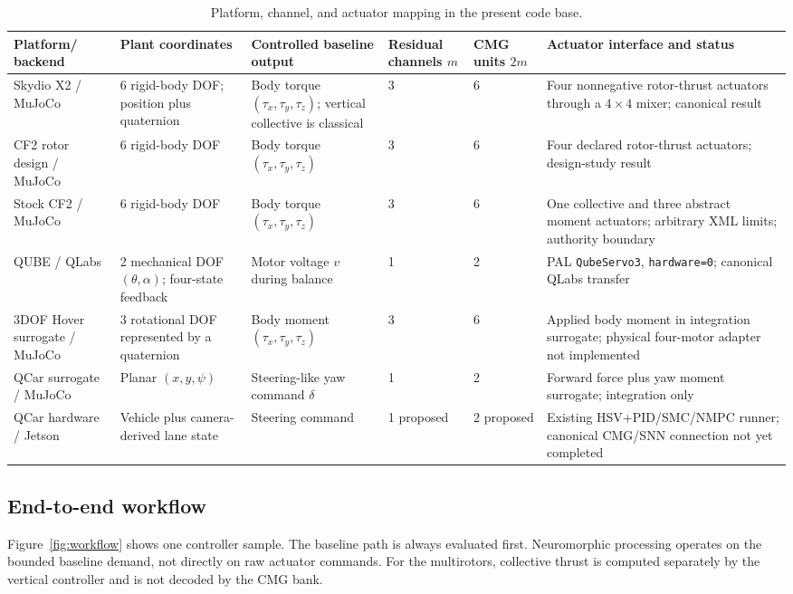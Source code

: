 \documentclass[10pt,twocolumn]{article}
\begin{document}
\begin{table}[t]
\centering
\caption{Platform, channel, and actuator mapping in the present code base.}
\label{tab:channels}
\small
\begin{tabular}{p{2.2cm}p{2.1cm}p{2.6cm}p{1.6cm}p{1.7cm}p{3.4cm}}
\toprule
\shortstack[l]{Platform/\\backend} & Plant coordinates & Controlled baseline output & Residual channels $m$ & CMG units $2m$ & Actuator interface and status \\
\midrule
Skydio X2 / MuJoCo & 6 rigid-body DOF; position plus quaternion & Body torque $(\tau_x,\tau_y,\tau_z)$; vertical collective is classical & 3 & 6 & Four nonnegative rotor-thrust actuators through a $4\times4$ mixer; canonical result \\
CF2 rotor design / MuJoCo & 6 rigid-body DOF & Body torque $(\tau_x,\tau_y,\tau_z)$ & 3 & 6 & Four declared rotor-thrust actuators; design-study result \\
Stock CF2 / MuJoCo & 6 rigid-body DOF & Body torque $(\tau_x,\tau_y,\tau_z)$ & 3 & 6 & One collective and three abstract moment actuators; arbitrary XML limits; authority boundary \\
QUBE / QLabs & 2 mechanical DOF $(\theta,\alpha)$; four-state feedback & Motor voltage $v$ during balance & 1 & 2 & PAL \texttt{QubeServo3}, \texttt{hardware=0}; canonical QLabs transfer \\
3DOF Hover surrogate / MuJoCo & 3 rotational DOF represented by a quaternion & Body moment $(\tau_x,\tau_y,\tau_z)$ & 3 & 6 & Applied body moment in integration surrogate; physical four-motor adapter not implemented \\
QCar surrogate / MuJoCo & Planar $(x,y,\psi)$ & Steering-like yaw command $\delta$ & 1 & 2 & Forward force plus yaw moment surrogate; integration only \\
QCar hardware / Jetson & Vehicle plus camera-derived lane state & Steering command & 1 proposed & 2 proposed & Existing HSV+PID/\allowbreak SMC/\allowbreak NMPC runner; canonical CMG/SNN connection not yet completed \\
\bottomrule
\end{tabular}
\end{table}

\subsection{End-to-end workflow}

Figure~\ref{fig:workflow} shows one controller sample. The baseline path is
always evaluated first. Neuromorphic processing operates on the bounded
baseline demand, not directly on raw actuator commands. For the multirotors,
collective thrust is computed separately by the vertical controller and is not
decoded by the CMG bank.
\end{document}
